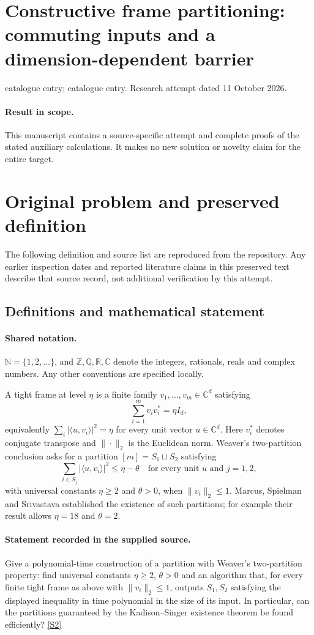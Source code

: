 \documentclass[11pt]{article}
\begin{document}
\section*{Constructive frame partitioning: commuting inputs and a dimension-dependent barrier}
\noindent catalogue entry; catalogue entry. Research attempt dated 11 October 2026.
\paragraph{Result in scope.}This manuscript contains a source-specific attempt and complete proofs of the stated auxiliary calculations. It makes no new solution or novelty claim for the entire target.
\section{Original problem and preserved definition}
The following definition and source list are reproduced from the repository. Any earlier inspection dates and reported literature claims in this preserved text describe that source record, not additional verification by this attempt.
\subsection{Definitions and mathematical statement}

\paragraph{Shared notation.}$\mathbb N=\{1,2,\ldots\}$, and $\mathbb Z,\mathbb Q,\mathbb R,\mathbb C$ denote the integers, rationals, reals and complex numbers. Any other conventions are specified locally.


A tight frame at level \(\eta\) is a finite family \(v_1,\ldots,v_m\in\mathbb C^d\) satisfying
\[\sum_{i=1}^m v_i v_i^*=\eta I_d,\]
equivalently \(\sum_i|\langle u,v_i\rangle|^2=\eta\) for every unit vector \(u\in\mathbb C^d\). Here \(v_i^*\) denotes conjugate transpose and \(\|\cdot\|_2\) is the Euclidean norm. Weaver's two-partition conclusion asks for a partition \([m]=S_1\sqcup S_2\) satisfying
\[\sum_{i\in S_j}|\langle u,v_i\rangle|^2\le\eta-\theta
\quad\text{for every unit }u\text{ and }j=1,2,\]
with universal constants \(\eta\ge2\) and \(\theta>0\), when \(\|v_i\|_2\le1\). Marcus, Spielman and Srivastava established the existence of such partitions; for example their result allows \(\eta=18\) and \(\theta=2\).
\paragraph{Statement recorded in the supplied source.}
Give a polynomial-time construction of a partition with Weaver's two-partition property: find universal constants \(\eta\ge2\), \(\theta>0\) and an algorithm that, for every finite tight frame as above with \(\|v_i\|_2\le1\), outputs \(S_1,S_2\) satisfying the displayed inequality in time polynomial in the size of its input. In particular, can the partitions guaranteed by the Kadison--Singer existence theorem be found efficiently? \href{https://arxiv.org/pdf/2205.02161}{[S2]}
\end{document}
